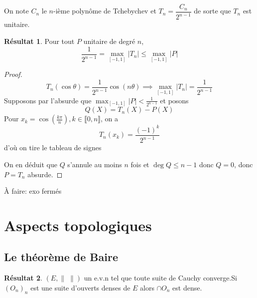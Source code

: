 \documentclass{article}
\theoremstyle{definition}
\newtheorem*{res}{Résultat}
\newcommand{\todo}[1]{{\color{red}À faire: #1}}
\begin{document}
On note $C_n$ le $n$-ième polynôme de Tchebychev et $T_n=\dfrac{C_n}{2^{n-1}}$ de sorte que $T_n$ est unitaire.

\begin{res}
Pour tout $P$ unitaire de degré $n$, \[
    \frac 1{2^{n-1}}=\max_{[-1, 1]}|T_n|\leq \max_{[-1, 1]}|P|
\]
\end{res}

\begin{proof}
\[
    T_n(\cos \theta)=\frac1{2^{n-1}}\cos (n\theta) \implies \max_{[-1, 1]}|T_n|=\frac1{2^{n-1}}
\]
Supposons par l'absurde que $\displaystyle\max_{[-1, 1]}|P|<\frac1{2^{n-1}}$ et posons \[
    Q(X)=T_n(X)-P(X)
\]
Pour $x_k=\cos\left(\frac{k\pi}n\right), k\in\llbracket 0, n\rrbracket$, on a \[
    T_n(x_k)=\frac{(-1)^k}{2^{n-1}}
\]
d'où on tire le tableau de signes
\begin{center}
\end{center}
On en déduit que $Q$ s'annule au moins $n$ fois et $\deg Q\leq n-1$ donc $Q=0$, donc $P=T_n$ absurde.
\end{proof}

\todo{exo fermés}

\section{Aspects topologiques}

\subsection{Le théorème de Baire}

\begin{res}
$(E, \|\;\|)$ un e.v.n tel que toute suite de Cauchy converge.Si $(O_n)_n$ est une suite d'ouverts denses de $E$ alors $\cap O_n$ est dense.
\end{res}
\end{document}
